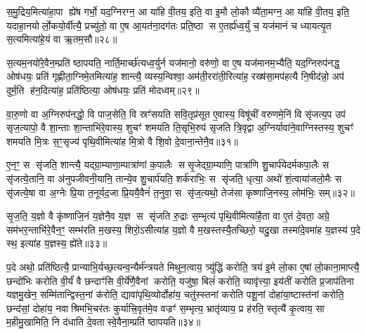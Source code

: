 स॒मु॒द्रिय॒मित्या॑हा॒पा ह्ये॑ष गर्भो॒ यद॒ग्निरग्न॒ आ या॑हि वी॒तय॒ इति॒ वा इ॒मौ लो॒कौ व्यै॑ता॒मग्न॒ आ या॑हि वी॒तय॒ इति॒ यदाहा॒नयोर्लो॒कयो॒र्वीत्यै॒ प्रच्यु॑तो॒ वा ए॒ष आ॒यत॑ना॒दग॑तः प्रति॒ष्ठा स ए॒तर्\mbox{}ह्य॑ध्व॒र्युं च॒ यज॑मानं च ध्यायत्यृ॒त स॒त्यमित्या॑हे॒यं वा ऋ॒तम॒सौ॥२८॥

स॒त्यम॒नयो॑रे॒वैन॒म्प्रति॑ ष्ठापयति॒ नार्ति॒मार्च्छ॑त्यध्व॒र्युर्न यज॑मानो॒ वरु॑णो॒ वा ए॒ष यज॑मानम॒भ्यैति॒ यद॒ग्निरुप॑नद्ध॒ ओष॑धयः॒ प्रति॑ गृह्णीता॒ग्निमे॒तमित्या॑ह॒ शान्त्यै॒ व्यस्य॒न्विश्वा॒ अम॑ती॒ररा॑ती॒रित्या॑ह॒ रख्ष॑सा॒मप॑हत्यै नि॒षीद॑न्नो॒ अप॑ दुर्म॒ति ह॑न॒दित्या॑ह॒ प्रति॑ष्ठित्या॒ ओष॑धयः॒ प्रति॑ मोदध्वम्॥२९॥

{\anuvakamend[{अ॒स्त्व॒नु॒ष्टुब॑सि सादय॒त्यारू॑ढः॒ पत्वेति॒ गर्भ॑म॒सौ मो॑दध्वं॒ द्विच॑त्वारिशच्च॥५॥}]}

{{}}

वा॒रु॒णो वा अ॒ग्निरुप॑नद्धो॒ वि पाज॒सेति॒ वि स्रꣳ॑सयति सवि॒तृप्र॑सूत ए॒वास्य॒ विषू॑चीं वरुणमे॒निं वि सृ॑जत्य॒प उप॑ सृज॒त्यापो॒ वै शा॒न्ताः शा॒न्ताभि॑रे॒वास्य॒ शुचꣳ॑ शमयति ति॒सृभि॒रुप॑ सृजति त्रि॒वृद्वा अ॒ग्निर्यावा॑ने॒वाग्निस्तस्य॒ शुचꣳ॑ शमयति मि॒त्रः स॒ꣳ॒सृज्य॑ पृथि॒वीमित्या॑ह मि॒त्रो वै शि॒वो दे॒वाना॒न्तेनै॒व॥३१॥

ए॒न॒ꣳ॒ स सृ॑जति॒ शान्त्यै॒ यद्ग्रा॒म्याणा॒म्पात्रा॑णां क॒पालैः ससृ॒जेद्ग्रा॒म्याणि॒ पात्रा॑णि शु॒चार्प॑येदर्मकपा॒लैः स सृ॑जत्ये॒तानि॒ वा अ॑नुपजीवनी॒यानि॒ तान्ये॒व शु॒चार्प॑यति॒ शर्क॑राभिः॒ स सृ॑जति॒ धृत्या॒ अथो॑ शं॒त्वाया॑जलो॒मैः स सृ॑जत्ये॒षा वा अ॒ग्नेः प्रि॒या त॒नूर्यद॒जा प्रि॒ययै॒वैनं॑ त॒नुवा॒ स सृ॑ज॒त्यथो॒ तेज॑सा कृष्णाजि॒नस्य॒ लोम॑भिः॒ सम्॥३२॥

सृ॒ज॒ति॒ य॒ज्ञो वै कृ॑ष्णाजि॒नं य॒ज्ञेनै॒व य॒ज्ञ स सृ॑जति रु॒द्राः स॒म्भृत्य॑ पृथि॒वीमित्या॑है॒ता वा ए॒तं दे॒वता॒ अग्रे॒ सम॑भर॒न्ताभि॑रे॒वैन॒ꣳ॒ सम्भ॑रति म॒खस्य॒ शिरो॒ऽसीत्या॑ह य॒ज्ञो वै म॒खस्तस्यै॒तच्छिरो॒ यदु॒खा तस्मा॑दे॒वमा॑ह य॒ज्ञस्य॑ प॒दे स्थ॒ इत्या॑ह य॒ज्ञस्य॒ ह्ये॑ते॥३३॥

प॒दे अथो॒ प्रति॑ष्ठित्यै॒ प्रान्याभि॒र्यच्छ॒त्यन्व॒न्यैर्म॑न्त्रयते मिथुन॒त्वाय॒ त्र्यु॑द्धिं करोति॒ त्रय॑ इ॒मे लो॒का ए॒षां लो॒काना॒माप्त्यै॒ छन्दो॑भिः करोति वी॒र्यं॑ वै छन्दाꣳ॑सि वी॒र्ये॑णै॒वैनां करोति॒ यजु॑षा॒ बिलं॑ करोति॒ व्यावृ॑त्त्या॒ इय॑तीं करोति प्र॒जाप॑तिना यज्ञमु॒खेन॒ सम्मि॑तान्द्विस्त॒नां क॑रोति॒ द्यावा॑पृथि॒व्योर्दोहा॑य॒ चतु॑स्स्तनां करोति पशू॒नां दोहा॑या॒ष्टास्त॑नां करोति॒ छन्द॑सां॒ दोहा॑य॒ नवाश्रिमभि॒चर॑तः कुर्यात्त्रि॒वृत॑मे॒व वज्रꣳ॑ स॒म्भृत्य॒ भ्रातृ॑व्याय॒ प्र ह॑रति॒ स्तृत्यै॑ कृ॒त्वाय॒ सा म॒हीमु॒खामिति॒ नि द॑धाति दे॒वतास्वे॒वैना॒म्प्रति॑ ष्ठापयति॥३४॥


